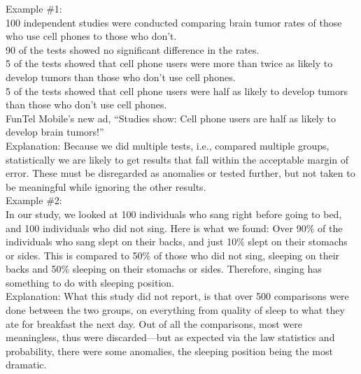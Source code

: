 \documentclass[a4paper,12pt,single,pdftex]{scrbook}
\begin{document}
    
      Example \#1:
    \\

    
      100 independent studies were conducted comparing brain tumor rates of those who use cell phones to those who don’t.
    \\

    
      90 of the tests showed no significant difference in the rates.
    \\

    
      5 of the tests showed that cell phone users were more than twice as likely to develop tumors than those who don’t use cell phones.
    \\

    
      5 of the tests showed that cell phone users were half as likely to develop tumors than those who don’t use cell phones.
    \\

    
      FunTel Mobile’s new ad, “Studies show: Cell phone users are half as likely to develop brain tumors!”
    \\

    
      Explanation: Because we did multiple tests, i.e., compared multiple groups, statistically we are likely to get results that fall within the acceptable margin of error.  These must be disregarded as anomalies or tested further, but not taken to be meaningful while ignoring the other results.
    \\

    
      Example \#2:
    \\

    
      In our study, we looked at 100 individuals who sang right before going to bed, and 100 individuals who did not sing.  Here is what we found: Over 90\% of the individuals who sang slept on their backs, and just 10\% slept on their stomachs or sides.  This is compared to 50\% of those who did not sing, sleeping on their backs and 50\% sleeping on their stomachs or sides.  Therefore, singing has something to do with sleeping position.
    \\

    
      Explanation: What this study did not report, is that over 500 comparisons were done between the two groups, on everything from quality of sleep to what they ate for breakfast the next day.  Out of all the comparisons, most were meaningless, thus were discarded—but as expected via the law statistics and probability, there were some anomalies, the sleeping position being the most dramatic. 
    \\
\end{document}
